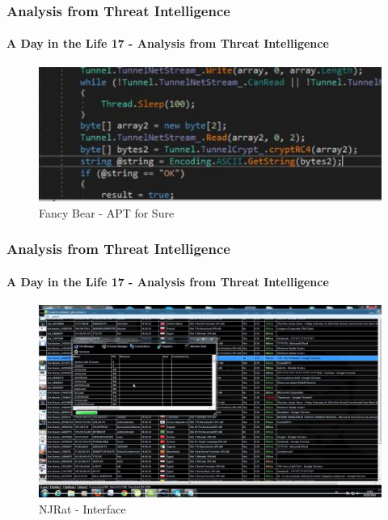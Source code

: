 \documentclass[aspectratio=169]{beamer}
\begin{document}
\begin{frame}
  \frametitle{Analysis from Threat Intelligence}
  \framesubtitle{A Day in the Life 17 - Analysis from Threat Intelligence}
  \begin{center}
    \begin{figure}
      \includegraphics[width=14cm,keepaspectratio]{fancy_bear_analysis_9}
      \caption{Fancy Bear - APT for Sure}
    \end{figure}
  \end{center}
\end{frame}

\begin{frame}
  \frametitle{Analysis from Threat Intelligence}
  \framesubtitle{A Day in the Life 17 - Analysis from Threat Intelligence}
  \begin{center}
    \begin{figure}
      \includegraphics[width=14cm,keepaspectratio]{njrat}
      \caption{NJRat - Interface}
    \end{figure}
  \end{center}
\end{frame}
\end{document}
